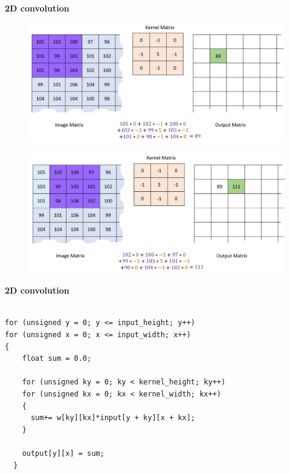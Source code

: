 \documentclass[xcolor=dvipsnames]{beamer}
\begin{document}
\begin{frame}{\bf 2D convolution}

\begin{figure}
\centering
\includegraphics[scale=0.2]{conv_02.jpg}
\end{figure}

\begin{figure}
\centering
\includegraphics[scale=0.2]{conv_03.jpg}
\end{figure}

\end{frame}




\begin{frame}[fragile]
{\bf 2D convolution}


\begin{lstlisting}

for (unsigned y = 0; y <= input_height; y++)
for (unsigned x = 0; x <= input_width; x++)
{
    float sum = 0.0;

    for (unsigned ky = 0; ky < kernel_height; ky++)
    for (unsigned kx = 0; kx < kernel_width; kx++)
    {
      sum+= w[ky][kx]*input[y + ky][x + kx];
    }

    output[y][x] = sum;
  }

\end{lstlisting}
\end{frame}
\end{document}
